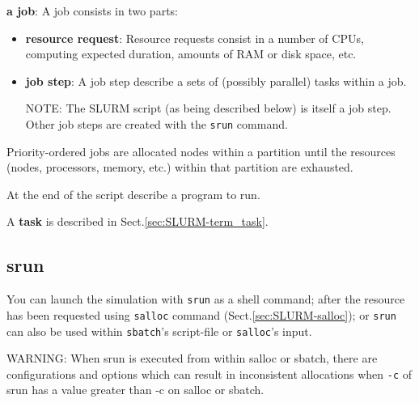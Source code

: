 {\bf a job}: A job consists in two parts:
  \begin{itemize}
    \item {\bf resource request}:
   Resource requests consist in a number of CPUs, computing expected
  duration, amounts of RAM or disk space, etc. 
   
    \item {\bf job step}: A job step describe a sets of (possibly parallel)
    tasks within a job.
      
 NOTE: The SLURM script (as being described below) is itself a job step. 
 Other job steps are created with the \verb!srun! command.
 
  \end{itemize}

Priority-ordered jobs are allocated nodes within a partition until the resources
(nodes, processors, memory, etc.) within that partition are exhausted.


At the end of the script describe a program to run.

A {\bf task} is described in
Sect.\ref{sec:SLURM-term_task}.

\subsection{srun}
\label{sec:SLURM-srun}
\label{sec:srun}

You can launch the simulation with \verb!srun! as a shell command; after the
resource has been requested using \verb!salloc! command
(Sect.\ref{sec:SLURM-salloc}); or \verb!srun! can also be used within
\verb!sbatch!'s script-file or \verb!salloc!'s input.

WARNING:  When  srun  is  executed from within salloc or sbatch, there are
configurations and options which can result in  inconsistent  allocations when
\verb!-c! of srun has a value greater than -c on salloc or sbatch.


